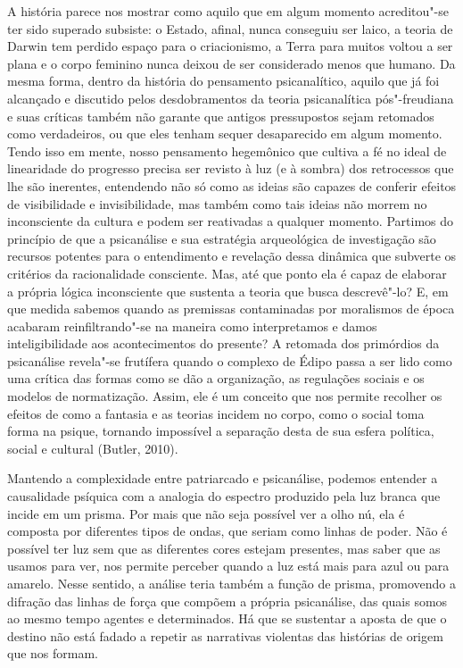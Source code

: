 A história parece nos mostrar como aquilo que em algum momento
acreditou"-se ter sido superado subsiste: o Estado, afinal, nunca
conseguiu ser laico, a teoria de Darwin tem perdido espaço para o
criacionismo, a Terra para muitos voltou a ser plana e o corpo feminino
nunca deixou de ser considerado menos que humano. Da mesma forma, dentro
da história do pensamento psicanalítico, aquilo que já foi alcançado e
discutido pelos desdobramentos da teoria psicanalítica pós"-freudiana e
suas críticas também não garante que antigos pressupostos sejam
retomados como verdadeiros, ou que eles tenham sequer desaparecido em
algum momento. Tendo isso em mente, nosso pensamento hegemônico que
cultiva a fé no ideal de linearidade do progresso precisa ser revisto à
luz (e à sombra) dos retrocessos que lhe são inerentes, entendendo não
só como as ideias são capazes de conferir efeitos de visibilidade e
invisibilidade, mas também como tais ideias não morrem no inconsciente
da cultura e podem ser reativadas a qualquer momento. Partimos do
princípio de que a psicanálise e sua estratégia arqueológica de
investigação são recursos potentes para o entendimento e revelação dessa
dinâmica que subverte os critérios da racionalidade consciente. Mas, até
que ponto ela é capaz de elaborar a própria lógica inconsciente que
sustenta a teoria que busca descrevê"-lo? E, em que medida sabemos quando
as premissas contaminadas por moralismos de época acabaram
reinfiltrando"-se na maneira como interpretamos e damos inteligibilidade
aos acontecimentos do presente? A retomada dos primórdios da psicanálise
revela"-se frutífera quando o complexo de Édipo passa a ser lido como uma
crítica das formas como se dão a organização, as regulações sociais e os
modelos de normatização. Assim, ele é um conceito que nos permite
recolher os efeitos de como a fantasia e as teorias incidem no corpo,
como o social toma forma na psique, tornando impossível a separação
desta de sua esfera política, social e cultural (Butler, 2010).

Mantendo a complexidade entre patriarcado e psicanálise, podemos
entender a causalidade psíquica com a analogia do espectro produzido
pela luz branca que incide em um prisma. Por mais que não seja possível
ver a olho nú, ela é composta por diferentes tipos de ondas, que seriam
como linhas de poder. Não é possível ter luz sem que as diferentes cores
estejam presentes, mas saber que as usamos para ver, nos permite
perceber quando a luz está mais para azul ou para amarelo. Nesse
sentido, a análise teria também a função de prisma, promovendo a
difração das linhas de força que compõem a própria psicanálise, das
quais somos ao mesmo tempo agentes e determinados. Há que se sustentar a
aposta de que o destino não está fadado a repetir as narrativas
violentas das histórias de origem que nos formam.

